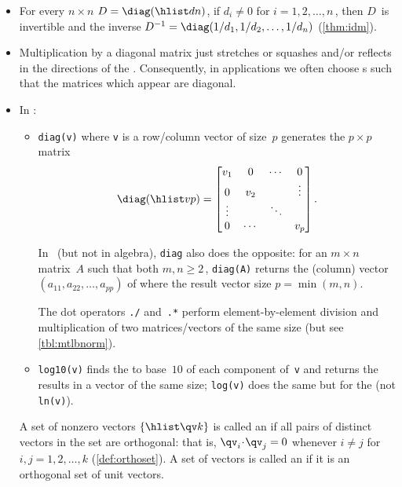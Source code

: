 \begin{itemize}
\item For every \(n\times n\)   \(D=\diag(\hlist dn)\), 
if  \(d_{i}\neq 0\) for \(i=1,2,\ldots,n\)\,, then \(D\)~is {invertible} and the inverse \(D^{-1}=\diag(1/d_{1},1/d_{2},\ldots,1/d_{n})\) (\autoref{thm:idm}).

\item Multiplication by a diagonal matrix just stretches or squashes and/or reflects in the directions of the .
Consequently, in applications we often choose s such that the matrices which appear are diagonal.

\item In \script:
\begin{itemize}
\item {}\verb|diag(v)| where \verb|v| is 
a row/column vector of size~\(p\) generates the \(p\times p\) matrix 
\begin{equation*}
\diag(\hlist vp)=\begin{bmatrix} v_1&0&\cdots&0\\
0&v_2&&\vdots\\ \vdots&&\ddots\\ 0&\cdots&&v_p \end{bmatrix}.
\end{equation*}

\itemhi In \script\ (but not in algebra), \verb|diag| also does the 
opposite: for an \(m\times n\) matrix~\(A\) such that both 
\(m,n\geq2\)\,,  \verb|diag(A)| returns 
the (column) vector \((a_{11},a_{22},\ldots,a_{pp})\) of 
 where the result vector size \(p=\min(m,n)\).

\itemhi The dot operators \verb|./| and~\verb|.*| perform element-by-element division and multiplication of two matrices\slash vectors of the same size (but see \autoref{tbl:mtlbnorm}).

\item \verb|log10(v)| finds the  to base~\(10\) of each component of~\verb|v| and returns the results in a vector of the same size; \verb|log(v)| does the same but for the  (not \verb|ln(v)|).

\end{itemize}



\itemhi A set of nonzero vectors \(\{\hlist\qv k\}\) is called an  if all pairs of distinct vectors in the set are {orthogonal}: that is, \(\qv_i\cdot\qv_j=0\) whenever \(i\neq j\) for \(i,j=1,2,\ldots,k\) (\autoref{def:orthoset}).
A set of vectors is called an  if it is an {orthogonal set} of {unit vector}s.


\end{itemize}
